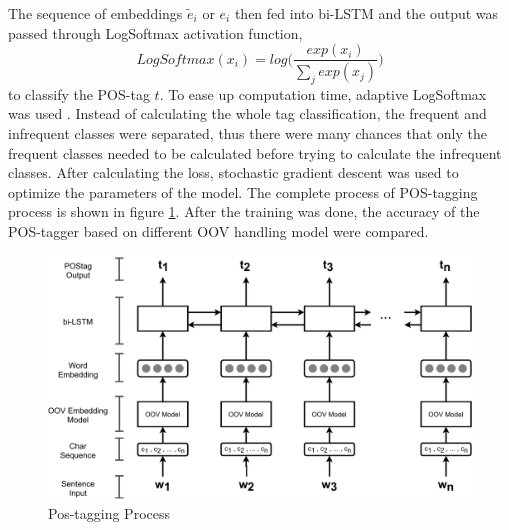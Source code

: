         The sequence of embeddings $\tilde{e}_i$ or $e_i$ then fed
        into bi-LSTM and the output was passed through LogSoftmax
        activation function,
        \begin{equation}
            \label{eq:logsoftmax}
            LogSoftmax(x_i) = log \Bigg(\frac{exp(x_i)}{\sum_j exp(x_j)}\Bigg)
        \end{equation}
        to classify the POS-tag $t$. To ease up computation time,
        adaptive LogSoftmax was used \citep{grave2018efficientsoftmax}.
        Instead of calculating the whole tag classification, the
        frequent and infrequent classes were separated, thus there were
        many chances that only the frequent classes needed to be calculated
        before trying to calculate the infrequent classes. After
        calculating the loss, stochastic gradient descent was used to
        optimize the parameters of the model. The complete process of
        POS-tagging process is shown in figure \ref{fig:postag}. After
        the training was done, the accuracy of the POS-tagger based on
        different OOV handling model were compared.

        \begin{figure}
            \centering
            \includegraphics[width=.8\linewidth]{images/postag.pdf}
            \caption{Pos-tagging Process}
            \label{fig:postag}
        \end{figure}
 

